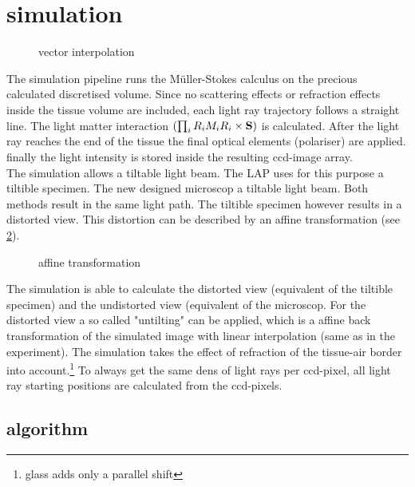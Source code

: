\section{simulation}
\label{sec:simulation}
% 
\begin{figure}[!t]
\centering
\def\tikzwidth{0.42*\textwidth}
\caption{vector interpolation}
\label{fig:vectorfield_disc}
\end{figure}
% 
The simulation pipeline runs the M\"uller-Stokes calculus on the precious calculated discretised volume.
Since no scattering effects or refraction effects inside the tissue volume are included, each light ray trajectory follows a straight line.
The light matter interaction $\left( \prod_i R_i M_i R_i \times \mathbf{S} \right)$ is calculated. 
After the light ray reaches the end of the tissue the final optical elements (\eg polariser) are applied.
finally the light intensity is stored inside the resulting ccd-image array.\\
% 
The simulation allows a tiltable light beam.
The \ac{LAP} uses for this purpose a tiltible specimen.
The new designed microscop a tiltable light beam.
Both methods result in the same light path.
The tiltible specimen however results in a distorted view.
This distortion can be described by an affine transformation (see \cref{fig::affine_transformation}).
% 
\begin{figure}[!t]
\centering

\caption{affine transformation}
\label{fig::affine_transformation}
\end{figure}
% 
The simulation is able to calculate the distorted view (equivalent of the tiltible specimen) and the undistorted view (equivalent of the microscop. 
For the distorted view a so called "untilting" can be applied, which is a affine back transformation of the simulated image with linear interpolation (same as in the experiment).
% 
The simulation takes the effect of refraction of the tissue-air border into account.\footnote{glass adds only a parallel shift}
% 
To always get the same dens of light rays per ccd-pixel, all light ray starting positions are calculated from the ccd-pixels.
% 
\subsection{algorithm}
% 
